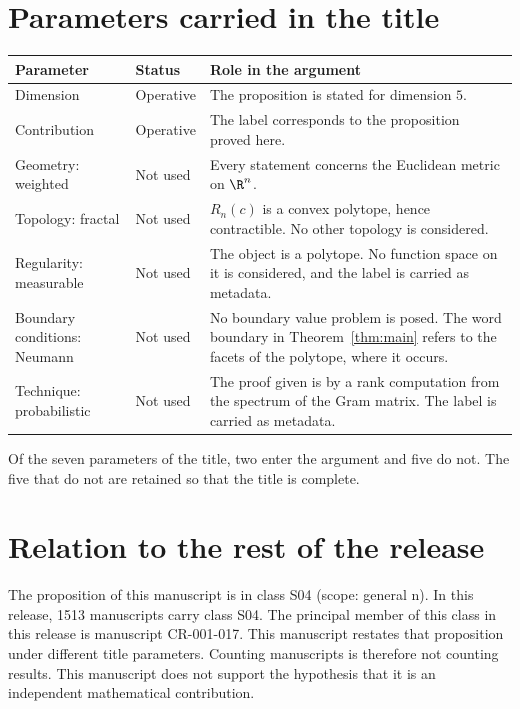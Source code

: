\documentclass[11pt]{article}
\begin{document}
\section{Parameters carried in the title}\label{sec:params}
\begin{center}
\small
\begin{tabular}{p{}p{}p{}}
\toprule
Parameter & Status & Role in the argument \\
\midrule
Dimension & Operative & The proposition is stated for dimension $5$. \\
Contribution & Operative & The label corresponds to the proposition proved here. \\
Geometry: weighted & Not used & Every statement concerns the Euclidean metric on $\R^n$. \\
Topology: fractal & Not used & $R_n(c)$ is a convex polytope, hence contractible. No other topology is considered. \\
Regularity: measurable & Not used & The object is a polytope. No function space on it is considered, and the label is carried as metadata. \\
Boundary conditions: Neumann & Not used & No boundary value problem is posed. The word boundary in Theorem~\ref{thm:main} refers to the facets of the polytope, where it occurs. \\
Technique: probabilistic & Not used & The proof given is by a rank computation from the spectrum of the Gram matrix. The label is carried as metadata. \\
\bottomrule
\end{tabular}
\end{center}
Of the seven parameters of the title, two enter the argument and five do not. The five that do not are retained so that the title is complete.

\section{Relation to the rest of the release}
The proposition of this manuscript is in class S04 (scope: general n).
In this release, 1513 manuscripts carry class S04. The principal member of this class in this release is manuscript CR-001-017. This manuscript restates that proposition under different title parameters.
Counting manuscripts is therefore not counting results. This manuscript does not support the hypothesis that it is an independent mathematical contribution.
\end{document}
